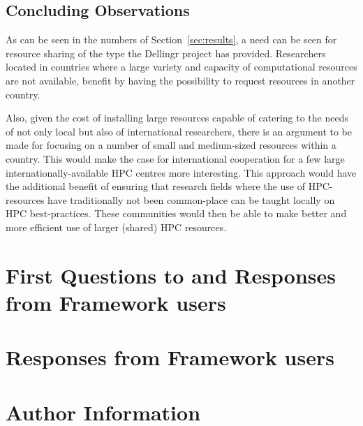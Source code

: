 \documentclass{article}
\newcommand{\dell}{Dellingr\xspace}
\begin{document}
\subsection{Concluding Observations}
\label{ssec:obs}

As can be seen in the numbers of Section~\ref{sec:results}, a need can be seen for resource sharing of the type the \dell project has provided.
Researchers located in countries where a large variety and capacity of computational resources are not available, benefit by having the possibility to request resources in another country.

Also, given the cost of installing large resources capable of catering to the needs of not only local but also of international researchers, there is an argument to be made for focusing on a number of small and medium-sized resources within a country.
This would make the case for international cooperation for a few large 
internationally-available HPC centres more interesting.
This approach would have the additional benefit of ensuring that research fields where the use of HPC-resources have traditionally not been common-place can be taught locally on HPC best-practices.
These communities would then be able to make better and more efficient use of larger (shared) HPC resources.

\newpage
{}


\newpage
\begin{appendices}

\section{First Questions to and Responses from Framework users}
\label{app:first-questions}


\newpage
\section{Responses from Framework users}
\label{app:answers}


\newpage
\section{Author Information}
\label{app:authors}


\end{appendices}
\end{document}
